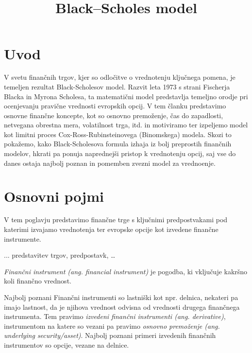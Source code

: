 \documentclass[twoside,11pt]{article}
\begin{document}



\klasifikacija{~} 
\title{Black–Scholes model}
\abstract{}

\glava\baselineskip=14.5pt

\smallskip

\section{Uvod}
    
    V svetu finančnih trgov, kjer so odločitve o vrednotenju ključnega pomena, je temeljen rezultat Black-Scholesov model. Razvit leta 1973 s strani Fischerja Blacka in Myrona Scholesa, ta matematični model predstavlja temeljno orodje pri ocenjevanju pravične vrednosti evropskih opcij. V tem članku predstavimo osnovne finančne koncepte, kot so osnovno premoženje, čas do zapadlosti, netvegana obrestna mera, volatilnost trga, itd. in motiviramo ter izpeljemo model kot limitni proces Cox-Ross-Rubinsteinovega (Binomskega) modela. Skozi to pokažemo, kako Black-Scholesova formula izhaja iz bolj preprostih finančnih modelov, hkrati pa ponuja naprednejši pristop k vrednotenju opcij, saj vse do danes ostaja najbolj poznan in pomemben zvezni model za vrednoenje. 

\section{Osnovni pojmi}
    V tem poglavju predstavimo finančne trge s ključnimi predpostvakami pod katerimi izvajamo vrednotenja ter evropske opcije kot izvedene finančne instrumente.

    ... predstavitev trgov, predpostavk, \dots

    \begin{definicija}
        \textit{Finančni instrument (ang. financial instrument)} je pogodba, ki vključuje kakršno koli finančno vrednost.
    \end{definicija}

    Najbolj poznani Finančni instrumenti so lastniški kot npr. delnica, nekateri pa imajo lastnost, da je njihova vrednost odvisna od vrednosti drugega finančnega instrumenta. Tem pravimo \textit{izvedeni finančni instrumenti (ang. derivative)}, instrumentom na katere so vezani pa pravimo \textit{osnovno premoženje (ang. underlying security/asset)}. Najbolj poznani primeri izvedenih finančnih instrumentov so opcije, vezane na delnice. 
\end{document}
